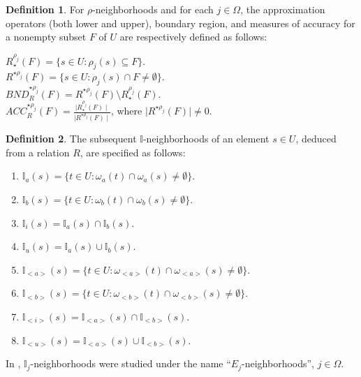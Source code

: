 \documentclass{article}
\theoremstyle{theorem}
\theoremstyle{definition}
\newtheorem{definition}{Definition}[section]
\theoremstyle{remark}
\begin{document}
\begin{definition} \label{d9} \cite{Atef 2020, El-Bably 2021, Nawar 2021} For $\rho$-neighborhoods and for each $j \in \Omega$, the approximation operators (both lower and upper), boundary region, and measures of accuracy for a nonempty subset $F$ of $U$ are respectively defined as follows:

\begin{center}
$R_{\star}^{\rho_j}(F) = \{s \in U : \rho_{j}(s) \subseteq F\}$.\\
$R^{\star\rho_j}(F) = \{s \in U : \rho_{j}(s) \cap F \neq\emptyset\}$.\\
$BND_{R}^{\star\rho_j}(F) = R^{\star\rho_j}(F) \setminus R_{\star}^{\rho_j}(F)$.\\
$ACC_{R}^{\star\rho_j}(F) = \frac{\mid R_{\star}^{\rho_j}(F)\mid}{\mid R^{\star\rho_j}(F)\mid}$, where $\mid R^{\star\rho_j}(F)\mid\neq0$.
\color{black}
\end{center}
\end{definition}

\begin{definition} \label{d3} \cite{Al-shami 2021} The subsequent $\mathbb{I}$-neighborhoods of an element $s \in U$, deduced from a relation $R$, are specified as follows:
\begin{enumerate}
\item $\mathbb{I}_{a}(s) = \{t \in U : \omega_{a}(t) \cap \omega_{a}(s) \neq\emptyset\}$.
\item  $\mathbb{I}_{b}(s) = \{t \in U : \omega_{b}(t) \cap \omega_{b}(s) \neq\emptyset\}$.
\item  $\mathbb{I}_{i}(s) = \mathbb{I}_{a}(s) \cap \mathbb{I}_{b}(s)$.
\item  $\mathbb{I}_{u}(s) = \mathbb{I}_{a}(s) \cup \mathbb{I}_{b}(s)$.
\item  $\mathbb{I}_{<a>}(s) = \{t \in U : \omega_{<a>}(t) \cap \omega_{<a>}(s) \neq\emptyset\}$.
\item  $\mathbb{I}_{<b>}(s) = \{t \in U : \omega_{<b>}(t) \cap \omega_{<b>}(s) \neq\emptyset\}$.
\item  $\mathbb{I}_{<i>}(s) = \mathbb{I}_{<a>}(s) \cap \mathbb{I}_{<b>}(s)$.
\item  $\mathbb{I}_{<u>}(s) = \mathbb{I}_{<a>}(s) \cup \mathbb{I}_{<b>}(s)$.
\end{enumerate}
\end{definition}

In \cite{Al-shami 2021}, $\mathbb{I}_{j}$-neighborhoods were studied under the name “$E_{j}$-neighborhoods”, $j \in \Omega$.
\end{document}

